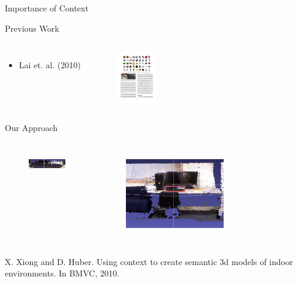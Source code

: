 \documentclass{beamer}
\begin{document}
\begin{frame}{Importance of Context}
\begin{block}{Previous Work}
\begin{columns}[t!]
\vskip -0.2in
\begin{itemize}
\item Lai et. al. (2010)
\end{itemize}
\begin{figure}
\vskip -0.2in
\includegraphics[width=.9\linewidth,height=0.9in]{lai_objects.pdf}
\end{figure}
\end{columns}
\end{block}
\pause
\vskip -0.1in
\begin{block}{Our Approach}

\begin{columns}

\vskip -0.2in
  \begin{figure}
  \includegraphics[width=.7\linewidth]{keyboard.png}\\
  \end{figure}
 
\pause
\vskip -0.2in
  \begin{figure}
  \includegraphics[width=.9\linewidth,height=1.2in]{keyboard_scene.png}\\
  \end{figure}
\end{columns}
\end{block}
\pause
{\scriptsize X. Xiong and D. Huber. Using context to create semantic 3d models of indoor environments. In BMVC, 2010.}
\end{frame}
\end{document}

